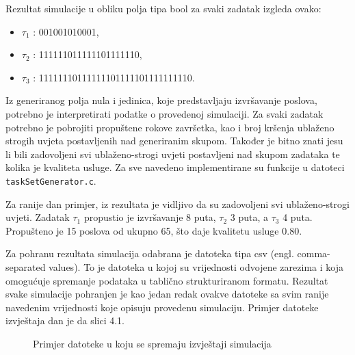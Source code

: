 \documentclass[../zavrsni.tex]{subfiles}
\begin{document}
Rezultat simulacije u obliku polja tipa bool za svaki zadatak izgleda ovako:

\begin{itemize}
        \item[] $\tau_1$ : 001001010001,
        \item[] $\tau_2$ : 111111011111101111110,
        \item[] $\tau_3$ : 11111110111111101111101111111110.
\end{itemize}

Iz generiranog polja nula i jedinica, koje predstavljaju izvršavanje poslova, potrebno je interpretirati podatke o provedenoj simulaciji.
Za svaki zadatak potrebno je pobrojiti propuštene rokove završetka, kao i broj kršenja ublaženo strogih uvjeta postavljenih nad generiranim skupom.
Također je bitno znati jesu li bili zadovoljeni svi ublaženo-strogi uvjeti 
postavljeni nad skupom zadataka te kolika je kvaliteta usluge. Za sve navedeno implementirane su funkcije u datoteci \texttt{taskSetGenerator.c}.

Za ranije dan primjer, iz rezultata je vidljivo da su zadovoljeni svi ublaženo-strogi uvjeti. Zadatak $\tau_1$ 
propustio je izvršavanje 8 puta, $\tau_2$ 3 puta, a $\tau_3$ 4 puta. Propušteno je 15 poslova od ukupno 65, što
daje kvalitetu usluge 0.80. 

Za pohranu rezultata simulacija odabrana je datoteka tipa csv (engl. comma-separated values). To je datoteka u kojoj su vrijednosti odvojene zarezima 
i koja omogućuje spremanje podataka u tablično strukturiranom formatu. Rezultat svake simulacije pohranjen je kao jedan redak ovakve datoteke sa svim ranije 
navedenim vrijednosti koje opisuju provedenu simulaciju. Primjer datoteke izvještaja dan je da slici 4.1.

\begin{figure}[!htb]
    \caption{\label{fig:my-label} Primjer datoteke u koju se spremaju izvještaji simulacija}
  \end{figure}
\end{document}
